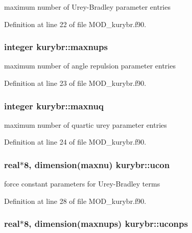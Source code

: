 maximum number of Urey-\/\-Bradley parameter entries 



Definition at line 22 of file M\-O\-D\-\_\-kurybr.\-f90.

\hypertarget{classkurybr_a0985b078f790810fc48fafe9ae7732df}{
\subsubsection[{maxnups}]{\setlength{\rightskip}{0pt plus 5cm}integer kurybr\-::maxnups}}\label{classkurybr_a0985b078f790810fc48fafe9ae7732df}


maximum number of angle repulsion parameter entries 



Definition at line 23 of file M\-O\-D\-\_\-kurybr.\-f90.

\hypertarget{classkurybr_a3e8676e31b4829ad722f50e1130d3744}{
\subsubsection[{maxnuq}]{\setlength{\rightskip}{0pt plus 5cm}integer kurybr\-::maxnuq}}\label{classkurybr_a3e8676e31b4829ad722f50e1130d3744}


maximum number of quartic urey parameter entries 



Definition at line 24 of file M\-O\-D\-\_\-kurybr.\-f90.

\hypertarget{classkurybr_ad5d1c061d42d5c928e1963e4d7ada287}{
\subsubsection[{ucon}]{\setlength{\rightskip}{0pt plus 5cm}real$\ast$8, dimension({\bf maxnu}) kurybr\-::ucon}}\label{classkurybr_ad5d1c061d42d5c928e1963e4d7ada287}


force constant parameters for Urey-\/\-Bradley terms 



Definition at line 28 of file M\-O\-D\-\_\-kurybr.\-f90.

\hypertarget{classkurybr_af7890bc737d1d919995652c218c7979a}{
\subsubsection[{uconps}]{\setlength{\rightskip}{0pt plus 5cm}real$\ast$8, dimension({\bf maxnups}) kurybr\-::uconps}}\label{classkurybr_af7890bc737d1d919995652c218c7979a}



